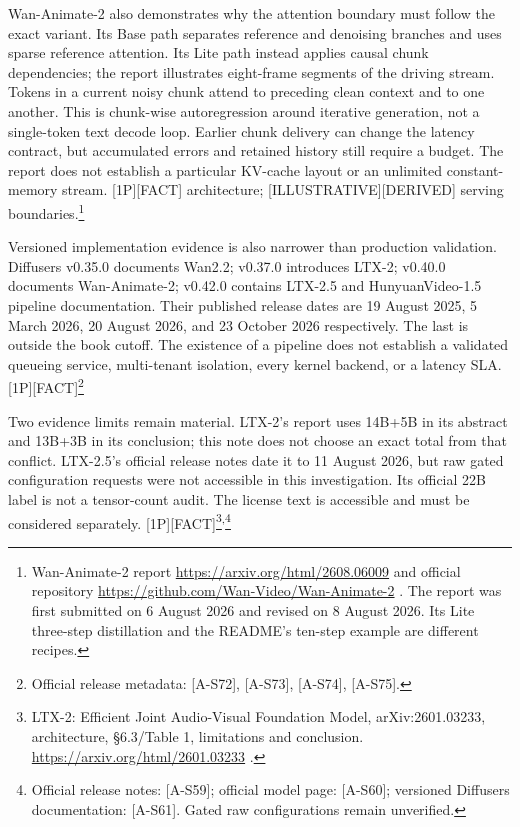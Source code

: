 Wan-Animate-2 also demonstrates why the attention boundary must follow
the exact variant. Its Base path separates reference and denoising
branches and uses sparse reference attention. Its Lite path instead
applies causal chunk dependencies; the report illustrates eight-frame
segments of the driving stream. Tokens in a current noisy chunk attend
to preceding clean context and to one another. This is chunk-wise
autoregression around iterative generation, not a single-token text
decode loop. Earlier chunk delivery can change the latency contract, but
accumulated errors and retained history still require a budget. The
report does not establish a particular KV-cache layout or an unlimited
constant-memory stream. \mbox{{[}1P{]}}\hspace{0pt}\mbox{{[}FACT{]}} architecture;
\mbox{{[}ILLUSTRATIVE{]}}\hspace{0pt}\mbox{{[}DERIVED{]}} serving boundaries.\footnote{Wan-Animate-2
  report \url{https://arxiv.org/html/2608.06009} and official repository
  \url{https://github.com/Wan-Video/Wan-Animate-2} . The report was first
  submitted on 6 August 2026 and revised on 8 August 2026. Its Lite
  three-step distillation and the README's ten-step example are
  different recipes.}

Versioned implementation evidence is also narrower than production
validation. Diffusers v0.35.0 documents Wan2.2; v0.37.0 introduces
LTX-2; v0.40.0 documents Wan-Animate-2; v0.42.0 contains LTX-2.5 and
HunyuanVideo-1.5 pipeline documentation. Their published release dates
are 19 August 2025, 5 March 2026, 20 August 2026, and 23 October 2026
respectively. The last is outside the book cutoff. The existence of a
pipeline does not establish a validated queueing service, multi-tenant
isolation, every kernel backend, or a latency SLA.
\mbox{{[}1P{]}}\hspace{0pt}\mbox{{[}FACT{]}}\footnote{Official release metadata: \mbox{{[}A-S72{]}},
  \mbox{{[}A-S73{]}}, \mbox{{[}A-S74{]}}, \mbox{{[}A-S75{]}}.}

Two evidence limits remain material. LTX-2's report uses 14B+5B in its
abstract and 13B+3B in its conclusion; this note does not choose an
exact total from that conflict. LTX-2.5's official release notes date it
to 11 August 2026, but raw gated configuration requests were not
accessible in this investigation. Its official 22B label is not a
tensor-count audit. The license text is accessible and must be
considered separately.
\mbox{{[}1P{]}}\hspace{0pt}\mbox{{[}FACT{]}}\footnote{LTX-2: Efficient Joint Audio-Visual
  Foundation Model, arXiv:2601.03233, architecture, §6.3/Table 1,
  limitations and conclusion. \url{https://arxiv.org/html/2601.03233} .}\textsuperscript{,}\footnote{Official
  release notes: \mbox{{[}A-S59{]}}; official model page: \mbox{{[}A-S60{]}};
  versioned Diffusers documentation: \mbox{{[}A-S61{]}}. Gated raw
  configurations remain unverified.}

